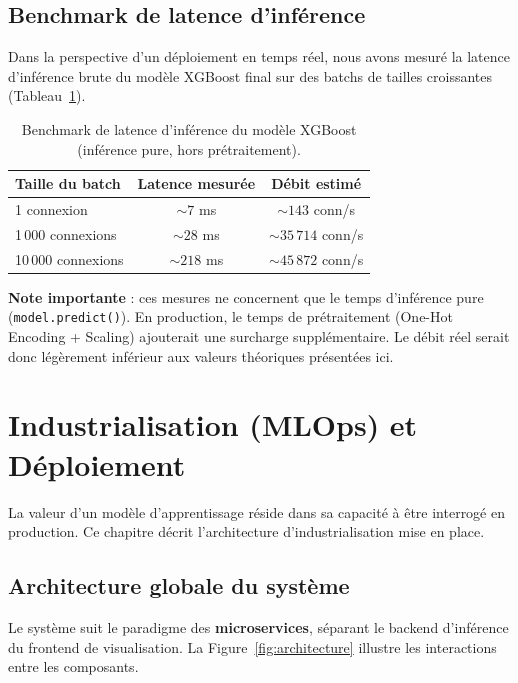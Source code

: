 \documentclass[12pt,a4paper]{report}
\begin{document}
\section{Benchmark de latence d'inférence}

Dans la perspective d'un déploiement en temps réel, nous avons mesuré la latence d'inférence brute du modèle XGBoost final sur des batchs de tailles croissantes (Tableau~\ref{tab:benchmark}).

\begin{table}[H]
    \centering
    \begin{tabular}{lcc}
        \toprule
        \textbf{Taille du batch} & \textbf{Latence mesurée} & \textbf{Débit estimé} \\
        \midrule
        1 connexion & $\sim 7$ ms & $\sim 143$ conn/s \\
        1\,000 connexions & $\sim 28$ ms & $\sim 35\,714$ conn/s \\
        10\,000 connexions & $\sim 218$ ms & $\sim 45\,872$ conn/s \\
        \bottomrule
    \end{tabular}
    \caption{Benchmark de latence d'inférence du modèle XGBoost (inférence pure, hors prétraitement).}
    \label{tab:benchmark}
\end{table}

\textbf{Note importante} : ces mesures ne concernent que le temps d'inférence pure (\texttt{model.predict()}). En production, le temps de prétraitement (One-Hot Encoding + Scaling) ajouterait une surcharge supplémentaire. Le débit réel serait donc légèrement inférieur aux valeurs théoriques présentées ici.


\chapter{Industrialisation (MLOps) et Déploiement}

La valeur d'un modèle d'apprentissage réside dans sa capacité à être interrogé en production. Ce chapitre décrit l'architecture d'industrialisation mise en place.

\section{Architecture globale du système}

Le système suit le paradigme des \textbf{microservices}, séparant le backend d'inférence du frontend de visualisation. La Figure~\ref{fig:architecture} illustre les interactions entre les composants.
\end{document}
